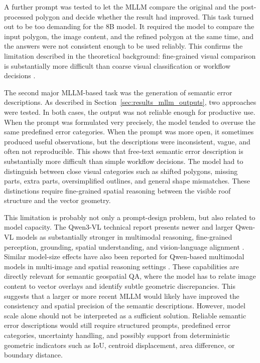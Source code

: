 A further prompt was tested to let the MLLM compare the original and the post-processed polygon and decide whether the result had improved. This task turned out to be too demanding for the 8B model. It required the model to compare the input polygon, the image content, and the refined polygon at the same time, and the answers were not consistent enough to be used reliably. This confirms the limitation described in the theoretical background: fine-grained visual comparison is substantially more difficult than coarse visual classification or workflow decisions \citep{wu2024comprehensive}.

The second major MLLM-based task was the generation of semantic error descriptions. As described in Section~\ref{sec:results_mllm_outputs}, two approaches were tested. In both cases, the output was not reliable enough for productive use. When the prompt was formulated very precisely, the model tended to overuse the same predefined error categories. When the prompt was more open, it sometimes produced useful observations, but the descriptions were inconsistent, vague, and often not reproducible. This shows that free-text semantic error description is substantially more difficult than simple workflow decisions. The model had to distinguish between close visual categories such as shifted polygons, missing parts, extra parts, oversimplified outlines, and general shape mismatches. These distinctions require fine-grained spatial reasoning between the visible roof structure and the vector geometry.

This limitation is probably not only a prompt-design problem, but also related to model capacity. The Qwen3-VL technical report presents newer and larger Qwen-VL models as substantially stronger in multimodal reasoning, fine-grained perception, grounding, spatial understanding, and vision-language alignment \citep{bai2025qwen3vltechnicalreport}. Similar model-size effects have also been reported for Qwen-based multimodal models in multi-image and spatial reasoning settings \citep{li2024llavanextinterleavetacklingmultiimagevideo}. These capabilities are directly relevant for semantic geospatial QA, where the model has to relate image content to vector overlays and identify subtle geometric discrepancies. This suggests that a larger or more recent MLLM would likely have improved the consistency and spatial precision of the semantic descriptions. However, model scale alone should not be interpreted as a sufficient solution. Reliable semantic error descriptions would still require structured prompts, predefined error categories, uncertainty handling, and possibly support from deterministic geometric indicators such as IoU, centroid displacement, area difference, or boundary distance.

